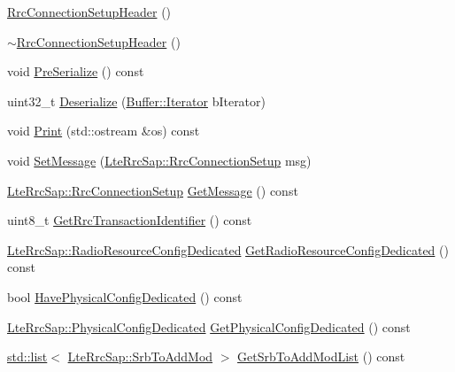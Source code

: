 \begin{DoxyCompactItemize}
\item 
\hyperlink{classns3_1_1RrcConnectionSetupHeader_ae925dd90e4e66197e92cf659a5e2ba73}{Rrc\+Connection\+Setup\+Header} ()
\item 
\hyperlink{classns3_1_1RrcConnectionSetupHeader_a79b14ab2795a55d0f2a72b0317d8b3dc}{$\sim$\+Rrc\+Connection\+Setup\+Header} ()
\item 
void \hyperlink{classns3_1_1RrcConnectionSetupHeader_ad123f10ef13f2bcdb05e66f4ba157fd7}{Pre\+Serialize} () const 
\item 
uint32\+\_\+t \hyperlink{classns3_1_1RrcConnectionSetupHeader_aa1f32f316948db4cbcca696b25973798}{Deserialize} (\hyperlink{classns3_1_1Buffer_1_1Iterator}{Buffer\+::\+Iterator} b\+Iterator)
\item 
void \hyperlink{classns3_1_1RrcConnectionSetupHeader_afd60456178a11650a11c070c47e57153}{Print} (std\+::ostream \&os) const 
\item 
void \hyperlink{classns3_1_1RrcConnectionSetupHeader_a03b2064f067cbb6756004a5252460c3b}{Set\+Message} (\hyperlink{structns3_1_1LteRrcSap_1_1RrcConnectionSetup}{Lte\+Rrc\+Sap\+::\+Rrc\+Connection\+Setup} msg)
\item 
\hyperlink{structns3_1_1LteRrcSap_1_1RrcConnectionSetup}{Lte\+Rrc\+Sap\+::\+Rrc\+Connection\+Setup} \hyperlink{classns3_1_1RrcConnectionSetupHeader_a1355d004dafc443016c87ecf893f62c3}{Get\+Message} () const 
\item 
uint8\+\_\+t \hyperlink{classns3_1_1RrcConnectionSetupHeader_a6403ab70f3993f706db49ec70038b5f9}{Get\+Rrc\+Transaction\+Identifier} () const 
\item 
\hyperlink{structns3_1_1LteRrcSap_1_1RadioResourceConfigDedicated}{Lte\+Rrc\+Sap\+::\+Radio\+Resource\+Config\+Dedicated} \hyperlink{classns3_1_1RrcConnectionSetupHeader_ae2945ceeb8596a81e63f6b63b3436bb6}{Get\+Radio\+Resource\+Config\+Dedicated} () const 
\item 
bool \hyperlink{classns3_1_1RrcConnectionSetupHeader_ae9fd6fa60bd97b1cf7c520c125f1e2e7}{Have\+Physical\+Config\+Dedicated} () const 
\item 
\hyperlink{structns3_1_1LteRrcSap_1_1PhysicalConfigDedicated}{Lte\+Rrc\+Sap\+::\+Physical\+Config\+Dedicated} \hyperlink{classns3_1_1RrcConnectionSetupHeader_a3475673e43b77e199e5f9bf59f05311f}{Get\+Physical\+Config\+Dedicated} () const 
\item 
\hyperlink{openflow-interface_8h_afd9bcfa176617760671b67580f536fa7}{std\+::list}$<$ \hyperlink{structns3_1_1LteRrcSap_1_1SrbToAddMod}{Lte\+Rrc\+Sap\+::\+Srb\+To\+Add\+Mod} $>$ \hyperlink{classns3_1_1RrcConnectionSetupHeader_a79f3a48a5f673defb863de1fa2a255a9}{Get\+Srb\+To\+Add\+Mod\+List} () const 

\end{DoxyCompactItemize}
